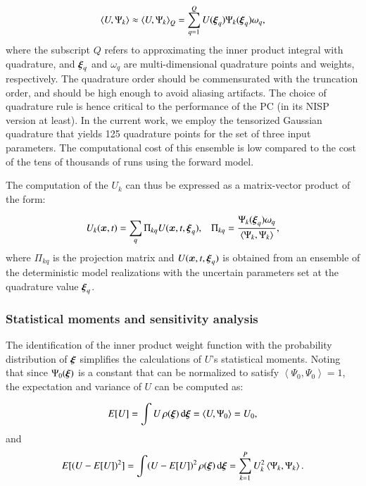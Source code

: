 \begin{equation}
  \left< U, \Psi_k \right> 
\approx \left< U, \Psi_k \right>_Q
= \sum_{q=1}^Q U(\xxi_q) \Psi_k(\xxi_q) \omega_q,
\end{equation}
where the subscript $Q$ refers to approximating the inner product integral with
quadrature, and $\xxi_q$ and $\omega_q$ are multi-dimensional quadrature points and weights,
respectively. The quadrature order should be commensurated with the
truncation order, and should be high enough to avoid aliasing artifacts.
The choice of quadrature rule is hence critical to the performance
of the PC (in its NISP version at least). In the current work, we employ the 
tensorized Gaussian quadrature that yields 125 quadrature points for the set of three input parameters.
The computational cost of this ensemble is low compared to the cost of the 
tens of thousands of runs using the forward model.

The computation of the ${U}_k$ can thus be expressed as a matrix-vector product of the form:

\begin{equation} 
 U_k(\bm{x},t)=\sum_q \Pi_{kq} U(\bm{x},t,\xxi_q),\;\;\;
 \Pi_{kq}=\frac{\Psi_k(\xxi_q)\omega_q}{\left< \Psi_k, \Psi_k \right>},
\end{equation} 
where $\Pi_{kq}$ is the projection matrix and $U(\bm{x},t,\xxi_q)$ is obtained
from an ensemble of the deterministic model realizations with the uncertain parameters set at
the quadrature value $\xxi_q$. 


\subsubsection{Statistical moments and sensitivity analysis}
The identification of the inner product weight function
with the probability distribution of $\xxi$ simplifies the calculations of $U$'s statistical moments. 
Noting that since $\Psi_0(\xxi)$ is a constant that can be normalized to satisfy 
$\left<\Psi_0,\Psi_0\right>=1$, the expectation and variance of $U$ can be computed as:

\begin{equation}
 E[U] = \int U \, \rho(\xxi) \, \mbox{d}\xxi=\left< U,\Psi_0\right> = U_0,  
 \label{eq:mean}
\end{equation}
and \begin{equation}
 E[(U-E[U])^2] = \int (U-E[U])^2 \, \rho(\xxi) \, \mbox{d}\xxi=\sum_{k=1}^P U_k^2
 \label{eq:sigma}
\left<\Psi_k,\Psi_k\right>.
\end{equation}

